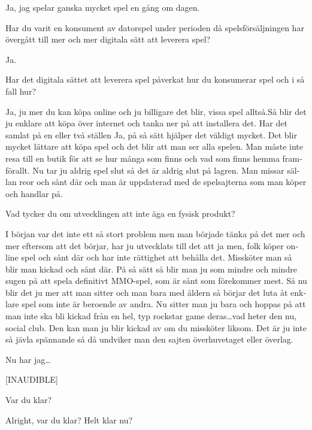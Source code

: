 \documentclass[11p]{article}
\begin{document}
\begin{otherlanguage}{swedish}
    \setlength{\leftskip}{1cm}
    Ja, jag spelar ganska mycket spel en gång om dagen.


    \setlength{\leftskip}{0cm}
    Har du varit en konsument av datorspel under perioden då spelsförsäljningen har övergått till mer och mer digitala sätt att leverera spel?

    \setlength{\leftskip}{1cm}
    Ja.

    \setlength{\leftskip}{0cm}
    Har det digitala sättet att leverera spel påverkat hur du konsumerar spel och i så fall hur?

    \setlength{\leftskip}{1cm}
    Ja, ju mer du kan köpa online och ju billigare det blir, vissa spel alltså.Så blir det ju enklare att köpa över internet och tanka ner på att installera det.
    Har det samlat på en eller två ställen Ja, på så sätt hjälper det väldigt mycket.
    Det blir mycket lättare att köpa spel och det blir att man ser alla spelen.
    Man måste inte resa till en butik för att se hur många som finns och vad som finns hemma framförallt. Nu tar ju aldrig spel slut så det är aldrig slut på lagren.
    Man missar sällan reor och sånt där och man är uppdaterad med de spelsajterna som man köper och handlar på.

    \setlength{\leftskip}{0cm}
    Vad tycker du om utvecklingen att inte äga en fysisk produkt?

    \setlength{\leftskip}{1cm}
    I början var det inte ett så stort problem men man började tänka på det mer och mer eftersom att det börjar, har ju utvecklats till det att ja men, folk köper online spel och sånt där och har inte rättighet att behålla det.
    Missköter man så blir man kickad och sånt där. På så sätt så blir man ju som mindre och mindre sugen på att spela definitivt MMO-spel, som är sånt som förekommer mest.
    Så nu blir det ju mer att man sitter och man bara med åldern så börjar det luta åt enklare spel som inte är beroende av andra.
    Nu sitter man ju bara och hoppas på att man inte ska bli kickad från en hel, typ rockstar game deras\dots vad heter den nu,  social club.
    Den kan man ju blir kickad av om du missköter liksom. Det är ju inte så jävla spännande så då undviker man den sajten överhuvetaget eller överlag.


    \setlength{\leftskip}{0cm}
    Nu har jag\dots

    \setlength{\leftskip}{1cm}
    [INAUDIBLE]

    \setlength{\leftskip}{0cm}
    Var du klar?

    \setlength{\leftskip}{1cm}
    Alright, var du klar? Helt klar nu?



\end{otherlanguage}
\end{document}
